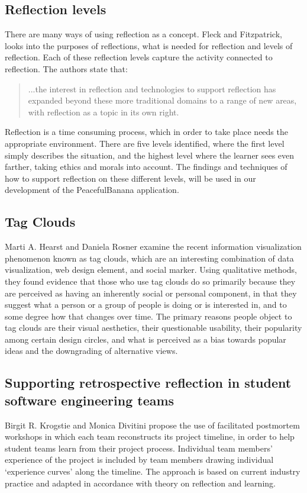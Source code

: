\subsection*{Reflection levels}
There are many ways of using reflection as a concept. Fleck and Fitzpatrick\cite{Fleck2010}, looks into the purposes of reflections, what is needed for reflection and levels of reflection. Each of these reflection levels capture the activity connected to reflection. The authors state that: 
\begin{quotation}
...the interest in reflection and technologies to support reflection has expanded beyond these more traditional domains to a range of new areas, with reflection as a topic in its own right. 
\end{quotation}
Reflection is a time consuming process, which in order to take place needs the appropriate environment. There are five levels identified, where the first level simply describes the situation, and the highest level where the learner sees even farther, taking ethics and morals into account. The findings and techniques of how to support reflection on these different levels\cite{Fleck2010}, will be used in our development of the PeacefulBanana application. 

\subsection{Tag Clouds}
Marti A. Hearst and Daniela Rosner\cite{Hearst2008} examine the recent information visualization phenomenon known as tag clouds, which are an interesting combination of data visualization, web design element, and social marker. Using qualitative methods, they found evidence that those who use tag clouds do so primarily because they are perceived as having an inherently social or personal component, in that they suggest what a person or a group of people is doing or is interested in, and to some degree how that changes over time. The primary reasons people object to tag clouds are their visual aesthetics, their questionable usability, their popularity among certain design circles, and what is perceived as a bias towards popular ideas and the downgrading of alternative views.

\subsection{Supporting retrospective reflection in student software engineering teams}
Birgit R. Krogstie and Monica Divitini\cite{Krogstie2009} propose the use of facilitated postmortem workshops in which each team reconstructs its project timeline, in order to help student teams learn from their project process. Individual team members’ experience of the project is included by team members drawing individual ‘experience curves’ along the timeline. The approach is based on current industry practice and adapted in accordance with theory on reflection and learning.

